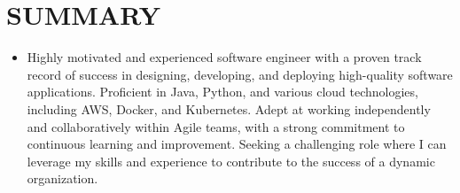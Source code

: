 \documentclass[letterpaper,11pt]{article}
\newcommand{\resumeItem}[1]{\item\small{{#1 \vspace{-3pt}}}}
\newcommand{\resumeSubHeadingListStart}{\begin{itemize}[leftmargin=0.15in, label={}]}
\newcommand{\resumeSubHeadingListEnd}{\end{itemize}}
\begin{document}
\section{{\fontsize{9pt}{20pt}\selectfont \textbf{SUMMARY}}}
\resumeSubHeadingListStart
\resumeItem{Highly motivated and experienced software engineer with a proven track record of success in designing, developing, and deploying high-quality software applications.  Proficient in Java, Python, and various cloud technologies, including AWS, Docker, and Kubernetes.  Adept at working independently and collaboratively within Agile teams, with a strong commitment to continuous learning and improvement. Seeking a challenging role where I can leverage my skills and experience to contribute to the success of a dynamic organization.}
\resumeSubHeadingListEnd\vspace{-15pt}
\end{document}
